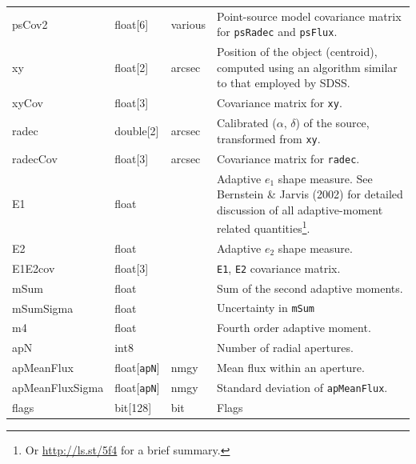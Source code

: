 \documentclass[12pt]{article}
\begin{document}
\begin{center}
\begin{longtable}{p{3cm}p{2cm}p{2cm}p{5cm}}
psCov2 & float[6] & various & Point-source model covariance matrix for {\tt psRadec} and {\tt psFlux}.\\ 


xy & float[2] & arcsec & Position of the object (centroid), computed using an algorithm similar to that employed by SDSS.\\

xyCov & float[3] & ~ & Covariance matrix for {\tt xy}. \\

radec & double[2] & arcsec & Calibrated ($\alpha$, $\delta$) of the source, transformed from {\tt xy}.\\

radecCov & float[3] & arcsec & Covariance matrix for {\tt radec}. \\


E1 & float & ~ & Adaptive $e_1$ shape measure. See Bernstein \& Jarvis (2002) for detailed discussion of all adaptive-moment related quantities\footnote{Or \url{http://ls.st/5f4} for a brief summary.}. \\

E2 & float & ~ & Adaptive $e_2$ shape measure. \\

E1E2cov & float[3] & ~ & {\tt E1}, {\tt E2} covariance matrix. \\

mSum & float & ~ & Sum of the second adaptive moments. \\

mSumSigma & float & ~ & Uncertainty in {\tt mSum} \\

m4 & float & ~ & Fourth order adaptive moment. \\



apN & int8 & ~ & Number of radial apertures. \\

apMeanFlux & float[{\tt apN}] & nmgy & Mean flux within an aperture. \\

apMeanFluxSigma & float[{\tt apN}] & nmgy & Standard deviation of {\tt apMeanFlux}. \\


flags & bit[128] & bit & Flags \\ \hline
\end{longtable}
\end{center}
\end{document}
